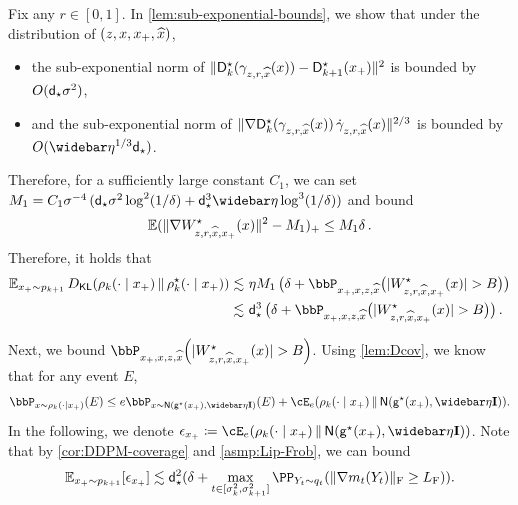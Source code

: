 Fix any $r\in[0,1]$.
In \cref{lem:sub-exponential-bounds}, we show that under the distribution of $(z,x,x_+,\widehat{x})$,
\begin{itemize}
    \item the sub-exponential norm of $\lVert\mathsf{D}^\star_k(\gamma_{z,r,\widehat{x}}(x))-\mathsf{D}^\star_{k+1}(x_+)\rVert^2$ is bounded by $O(\mathsf{d}_\star\sigma^2)$,
    \item and the sub-exponential norm of $ \lVert\nabla \mathsf{D}^\star_k(\gamma_{z,r,\widehat{x}}(x))\,\dot\gamma_{z,r,\widehat{x}}(x)\rVert^{2/3}$ is bounded by $O(\etabar^{1/3}\dbar)$.
\end{itemize}
Therefore, for a sufficiently large constant $C_1$, we can set $M_1=C_1\sigma^{-4}\,(\dbar\sigma^2\log^2(1/\delta)+\dbar^{3}\etabar\log^3(1/\delta))$ and bound
\begin{align*}
    \operatorname{\mathbb{E}} (\lVert\nabla W^\star_{z,r,\widehat{x},x_+}(x)\rVert^2-M_1)_+ \leq M_1\delta\,.
\end{align*}
Therefore, it holds that
\begin{align*}
    \En_{x_+\sim p_{k+1}} \Dkl{\rho_k(\cdot\mid x_+)}{\rhostar_k(\cdot\mid x_+)} 
    \leqsim &~ \eta M_1\,\prn[\big]{\delta+\bbP_{x_+,x,z,\xhat}\prn[\big]{\abs{\Wstar_{z,r,\xhat,x_+}(x)}>\B}} \\
    \leqsim &~ \dstar^3\,\prn[\big]{\delta+\bbP_{x_+,x,z,\xhat}\prn[\big]{\abs{\Wstar_{z,r,\xhat,x_+}(x)}>\B}}\,.
\end{align*}


Next, we bound $\bbP_{x_+,x,z,\xhat}\prn*{\abs{\Wstar_{z,r,\xhat,x_+}(x)}>\B}$. Using \cref{lem:Dcov}, we know that for any event $E$,
\begin{align*}
    \bbP_{x\sim \rho_k(\cdot\mid x_+)}(E)\leq  e\bbP_{x\sim \normal{\gds(x_+), \etabar\Id}}(E)+\Dcov[e]{\rho_k(\cdot\mid x_+)}{\normal{\gds(x_+), \etabar\Id}}.
\end{align*}
In the following, we denote $\eps_{x_+}\deq \Dcov[e]{\rho_k(\cdot\mid x_+)}{\normal{\gds(x_+), \etabar\Id}}$. Note that by \cref{cor:DDPM-coverage} and \cref{asmp:Lip-Frob}, we can bound
\begin{align}
    \En_{x_+\sim p_{k+1}}[\eps_{x_+}]\leqsim \dstar^2(\delta+\max_{t\in[\sigma_k^2,\sigma_{k+1}^2]}\PP_{Y_t\sim q_t}\prn*{\nrmF{\nabla m_t(Y_t)}\geq \LF}).
\end{align}

